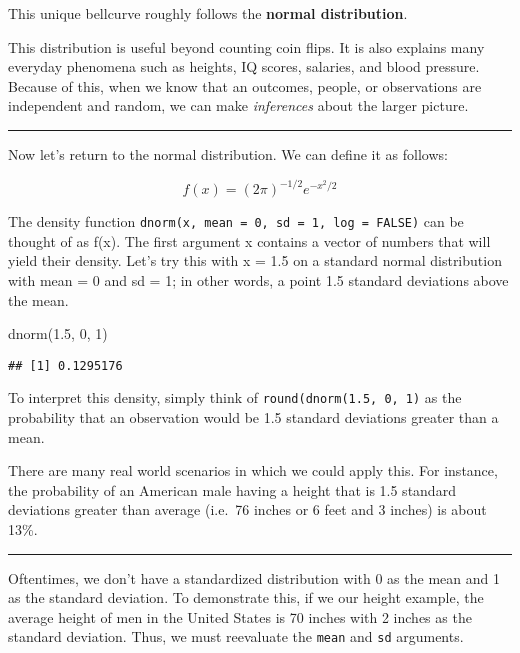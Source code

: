 \documentclass[
]{book}
\newenvironment{Shaded}{\begin{snugshade}}{\end{snugshade}}
\newcommand{\DecValTok}[1]{\textcolor[rgb]{0.00,0.00,0.81}{#1}}
\newcommand{\FloatTok}[1]{\textcolor[rgb]{0.00,0.00,0.81}{#1}}
\newcommand{\FunctionTok}[1]{\textcolor[rgb]{0.00,0.00,0.00}{#1}}
\newcommand{\NormalTok}[1]{#1}
\begin{document}
This unique bellcurve roughly follows the \textbf{normal distribution}.

This distribution is useful beyond counting coin flips. It is also explains many everyday phenomena such as heights, IQ scores, salaries, and blood pressure. Because of this, when we know that an outcomes, people, or observations are independent and random, we can make \emph{inferences} about the larger picture.

\begin{center}\rule{0.5\linewidth}{0.5pt}\end{center}

Now let's return to the normal distribution. We can define it as follows:

\[f(x)=(2\pi)^{-1/2}e^{-x^2/2}\]

The density function \texttt{dnorm(x,\ mean\ =\ 0,\ sd\ =\ 1,\ log\ =\ FALSE)} can be thought of as f(x). The first argument x contains a vector of numbers that will yield their density. Let's try this with x = 1.5 on a standard normal distribution with mean = 0 and sd = 1; in other words, a point 1.5 standard deviations above the mean.

\begin{Shaded}
\begin{Highlighting}[]
\FunctionTok{dnorm}\NormalTok{(}\FloatTok{1.5}\NormalTok{, }\DecValTok{0}\NormalTok{, }\DecValTok{1}\NormalTok{)}
\end{Highlighting}
\end{Shaded}

\begin{verbatim}
## [1] 0.1295176
\end{verbatim}

To interpret this density, simply think of \texttt{round(dnorm(1.5,\ 0,\ 1)} as the probability that an observation would be 1.5 standard deviations greater than a mean.

There are many real world scenarios in which we could apply this. For instance, the probability of an American male having a height that is 1.5 standard deviations greater than average (i.e.~76 inches or 6 feet and 3 inches) is about 13\%.

\begin{center}\rule{0.5\linewidth}{0.5pt}\end{center}

Oftentimes, we don't have a standardized distribution with 0 as the mean and 1 as the standard deviation. To demonstrate this, if we our height example, the average height of men in the United States is 70 inches with 2 inches as the standard deviation. Thus, we must reevaluate the \texttt{mean} and \texttt{sd} arguments.
\end{document}
